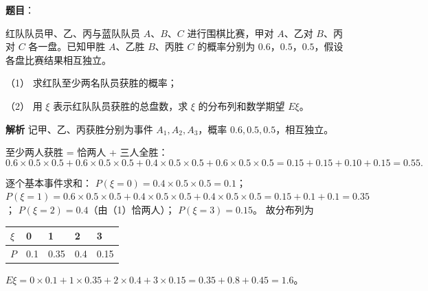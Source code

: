 \begin{answer}

\textbf{题目}：

红队队员甲、乙、丙与蓝队队员 $A$、$B$、$C$ 进行围棋比赛，甲对 $A$、乙对 $B$、丙对 $C$ 各一盘。已知甲胜 $A$、乙胜 $B$、丙胜 $C$ 的概率分别为 $0.6$，$0.5$，$0.5$，假设各盘比赛结果相互独立。

（1） 求红队至少两名队员获胜的概率；

（2） 用 $\xi$ 表示红队队员获胜的总盘数，求 $\xi$ 的分布列和数学期望 $E\xi$。

\textbf{解析}
记甲、乙、丙获胜分别为事件 $A_1,A_2,A_3$，概率 $0.6,0.5,0.5$，相互独立。

至少两人获胜 = 恰两人 + 三人全胜：
\nopagebreak[4]
\[0.6\times0.5\times0.5+0.6\times0.5\times0.5+0.4\times0.5\times0.5+0.6\times0.5\times0.5=0.15+0.15+0.10+0.15=0.55.\]

逐个基本事件求和：
$P(\xi=0)=0.4\times0.5\times0.5=0.1$；
$P(\xi=1)=0.6\times0.5\times0.5+0.4\times0.5\times0.5+0.4\times0.5\times0.5=0.15+0.1+0.1=0.35$；
$P(\xi=2)=0.4$（由（1）恰两人）；
$P(\xi=3)=0.15$。
故分布列为
\begin{center}
\begin{tabular}{lllll}
\toprule
$\xi$ & 0 & 1 & 2 & 3 \\
\midrule
$P$ & 0.1 & 0.35 & 0.4 & 0.15 \\
\bottomrule
\end{tabular}
\end{center}

$E\xi=0\times0.1+1\times0.35+2\times0.4+3\times0.15=0.35+0.8+0.45=1.6$。



\end{answer}
